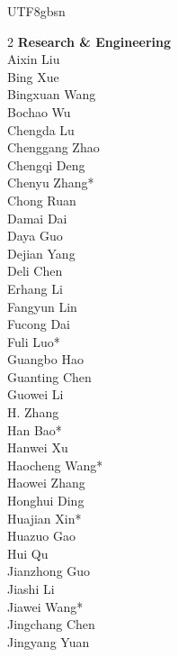 \documentclass[11pt, a4paper, logo, copyright, nonumbering]{deepseek}
\begin{document}
\begin{CJK*}{UTF8}{gbsn}
\begin{multicols}{2} 
\noindent
\textbf{\color{damaiblue} Research \& Engineering} \\
\color{damaiblue} Aixin Liu \\
\color{damaiblue} Bing Xue \\
\color{damaiblue} Bingxuan Wang \\
\color{damaiblue} Bochao Wu \\
\color{damaiblue} Chengda Lu \\
\color{damaiblue} Chenggang Zhao \\
\color{damaiblue} Chengqi Deng \\
\color{damaiblue} Chenyu Zhang* \\
\color{damaiblue} Chong Ruan \\
\color{damaiblue} Damai Dai \\
\color{damaiblue} Daya Guo \\
\color{damaiblue} Dejian Yang \\
\color{damaiblue} Deli Chen \\
\color{damaiblue} Erhang Li \\
\color{damaiblue} Fangyun Lin \\
\color{damaiblue} Fucong Dai \\
\color{damaiblue} Fuli Luo* \\
\color{damaiblue} Guangbo Hao \\
\color{damaiblue} Guanting Chen \\
\color{damaiblue} Guowei Li \\
\color{damaiblue} H. Zhang \\
\color{damaiblue} Han Bao* \\
\color{damaiblue} Hanwei Xu \\
\color{damaiblue} Haocheng Wang* \\
\color{damaiblue} Haowei Zhang \\
\color{damaiblue} Honghui Ding \\
\color{damaiblue} Huajian Xin* \\
\color{damaiblue} Huazuo Gao \\
\color{damaiblue} Hui Qu \\
\color{damaiblue} Jianzhong Guo \\
\color{damaiblue} Jiashi Li \\
\color{damaiblue} Jiawei Wang* \\
\color{damaiblue} Jingchang Chen \\
\color{damaiblue} Jingyang Yuan \\

\end{multicols}
\end{CJK*}
\end{document}
